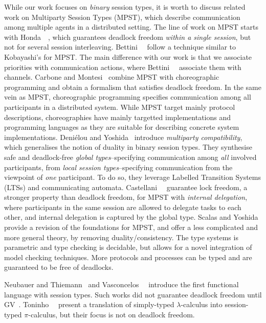 While our work focuses on \emph{binary} session types, it is worth to discuss related work on Multiparty Session Types (MPST), which describe communication among multiple agents in a distributed setting. The line of work on MPST starts with Honda~\etal~\cite{hondayoshida08}, which guarantees deadlock freedom \emph{within a single session}, but not for several session interleaving.
Bettini~\etal~\cite{bettinicoppo08} follow a technique similar to Kobayashi's for MPST.
The main difference with our work is that we associate priorities with communication actions, where Bettini~\etal~\cite{bettinicoppo08} associate them with channels.
Carbone and Montesi~\cite{carbonemontesi13} combine MPST with choreographic programming and obtain a formalism that satisfies deadlock freedom. In the same vein as MPST, choreographic programming specifies communication among all participants in a distributed system. While MPST target mainly protocol descriptions, choreographies have mainly targetted implementations and programming languages as they are suitable for describing concrete system implementations.
Deni\'{e}lou and Yoshida~\cite{DenielouY13} introduce \emph{multiparty compatibility}, which generalises the notion of duality in binary session types. They synthesise safe and deadlock-free \emph{global types}--specifying communication among \emph{all} involved participants, from \emph{local session types}--specifying communication from the viewpoint of \emph{one} participant. To do so, they leverage Labelled Transition Systems (LTSs) and communicating automata.
Castellani~\etal~\cite{CastellaniDGH20} guarantee lock freedom, a stronger property than deadlock freedom, for MPST with \emph{internal delegation}, where participants in the same session are allowed to delegate tasks to each other, and internal delegation is captured by the global type.
Scalas and Yoshida~\cite{scalasyoshida19} provide a revision of the foundations for MPST, and offer a less complicated and more general theory, by removing duality/consistency. The type systems is parametric and type checking is decidable, but allows for a novel integration of model checking techniques. More protocols and processes can be typed and are guaranteed to be free of deadlocks.


Neubauer and Thiemann~\cite{neubauert04} and Vasconcelos~\etal~\cite{vasconcelosravara04,vasconcelosgay06} introduce the first functional language with session types. Such works did not guarantee deadlock freedom until GV~\cite{lindleymorris15,wadler14}.
Toninho~\etal~\cite{toninhocaires12} present a translation of simply-typed $\lambda$-calculus into session-typed $\pi$-calculus, but their focus is not on deadlock freedom.

